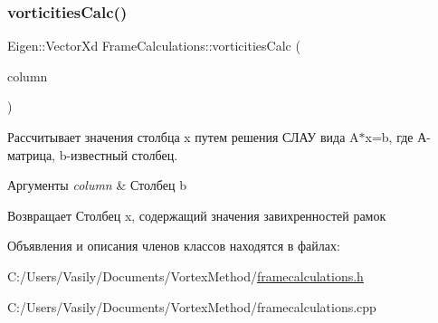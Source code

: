 \subsubsection{\texorpdfstring{vorticities\+Calc()}{vorticitiesCalc()}}
{\footnotesize\ttfamily Eigen\+::\+Vector\+Xd Frame\+Calculations\+::vorticities\+Calc (\begin{DoxyParamCaption}\item[{const Eigen\+::\+Vector\+Xd \&}]{column }\end{DoxyParamCaption})}

Рассчитывает значения столбца x путем решения СЛАУ вида A$\ast$x=b, где А-\/матрица, b-\/известный столбец. 
\begin{DoxyParams}{Аргументы}
{\em column} & Столбец b \\
\hline
\end{DoxyParams}
\begin{DoxyReturn}{Возвращает}
Столбец x, содержащий значения завихренностей рамок 
\end{DoxyReturn}


Объявления и описания членов классов находятся в файлах\+:\begin{DoxyCompactItemize}
\item 
C\+:/\+Users/\+Vasily/\+Documents/\+Vortex\+Method/\mbox{\hyperlink{framecalculations_8h}{framecalculations.\+h}}\item 
C\+:/\+Users/\+Vasily/\+Documents/\+Vortex\+Method/framecalculations.\+cpp\end{DoxyCompactItemize}
